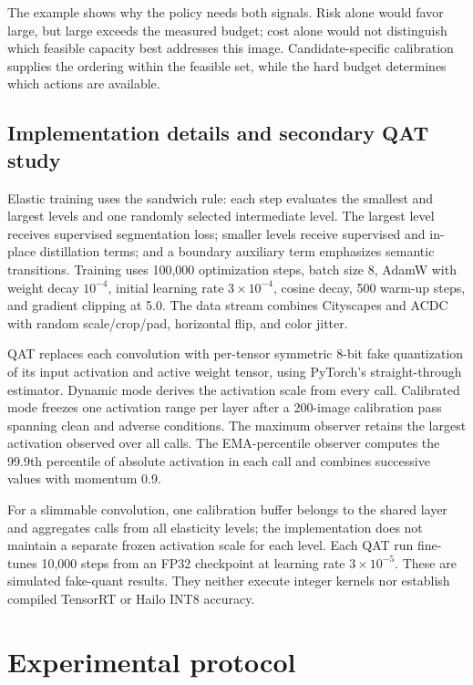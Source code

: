 \documentclass[a4paper,review,12pt]{elsarticle}
\begin{document}
The example shows why the policy needs both signals. Risk alone would favor large, but large exceeds the measured budget; cost alone would not distinguish which feasible capacity best addresses this image. Candidate-specific calibration supplies the ordering within the feasible set, while the hard budget determines which actions are available.

\subsection{Implementation details and secondary QAT study}
\label{sec:qatmethod}

Elastic training uses the sandwich rule: each step evaluates the smallest and largest levels and one randomly selected intermediate level. The largest level receives supervised segmentation loss; smaller levels receive supervised and in-place distillation terms; and a boundary auxiliary term emphasizes semantic transitions. Training uses 100,000 optimization steps, batch size 8, AdamW with weight decay $10^{-4}$, initial learning rate $3\times10^{-4}$, cosine decay, 500 warm-up steps, and gradient clipping at 5.0. The data stream combines Cityscapes and ACDC with random scale/crop/pad, horizontal flip, and color jitter.

QAT replaces each convolution with per-tensor symmetric 8-bit fake quantization of its input activation and active weight tensor, using PyTorch's straight-through estimator. Dynamic mode derives the activation scale from every call. Calibrated mode freezes one activation range per layer after a 200-image calibration pass spanning clean and adverse conditions. The maximum observer retains the largest activation observed over all calls. The EMA-percentile observer computes the 99.9th percentile of absolute activation in each call and combines successive values with momentum 0.9.

For a slimmable convolution, one calibration buffer belongs to the shared layer and aggregates calls from all elasticity levels; the implementation does not maintain a separate frozen activation scale for each level. Each QAT run fine-tunes 10,000 steps from an FP32 checkpoint at learning rate $3\times10^{-5}$. These are simulated fake-quant results. They neither execute integer kernels nor establish compiled TensorRT or Hailo INT8 accuracy.

\section{Experimental protocol}
\label{sec:protocol}
\end{document}
